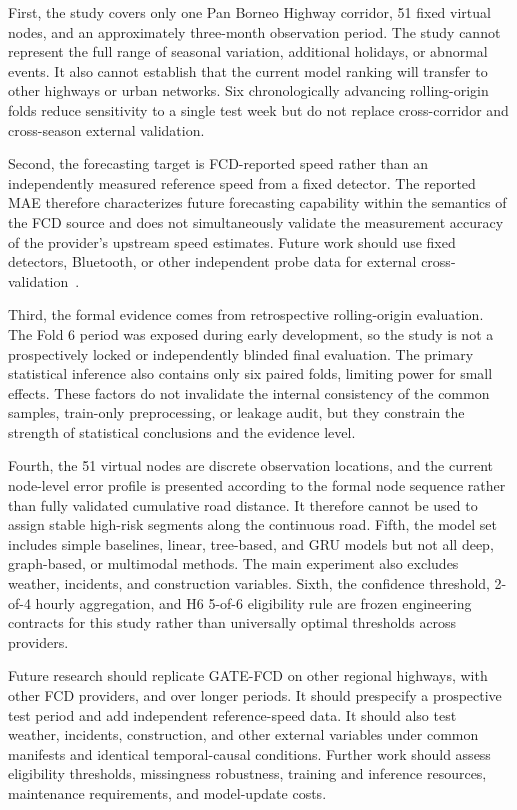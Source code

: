 \documentclass[pdflatex,sn-mathphys-num,iicol]{sn-jnl}
\begin{document}
First, the study covers only one Pan Borneo Highway corridor, 51 fixed virtual nodes, and an approximately three-month observation period. The study cannot represent the full range of seasonal variation, additional holidays, or abnormal events. It also cannot establish that the current model ranking will transfer to other highways or urban networks. Six chronologically advancing rolling-origin folds reduce sensitivity to a single test week but do not replace cross-corridor and cross-season external validation.

Second, the forecasting target is FCD-reported speed rather than an independently measured reference speed from a fixed detector. The reported MAE therefore characterizes future forecasting capability within the semantics of the FCD source and does not simultaneously validate the measurement accuracy of the provider's upstream speed estimates. Future work should use fixed detectors, Bluetooth, or other independent probe data for external cross-validation~\cite{Ipekyuz2025FCD}.

Third, the formal evidence comes from retrospective rolling-origin evaluation. The Fold 6 period was exposed during early development, so the study is not a prospectively locked or independently blinded final evaluation. The primary statistical inference also contains only six paired folds, limiting power for small effects. These factors do not invalidate the internal consistency of the common samples, train-only preprocessing, or leakage audit, but they constrain the strength of statistical conclusions and the evidence level.

Fourth, the 51 virtual nodes are discrete observation locations, and the current node-level error profile is presented according to the formal node sequence rather than fully validated cumulative road distance. It therefore cannot be used to assign stable high-risk segments along the continuous road. Fifth, the model set includes simple baselines, linear, tree-based, and GRU models but not all deep, graph-based, or multimodal methods. The main experiment also excludes weather, incidents, and construction variables. Sixth, the confidence threshold, 2-of-4 hourly aggregation, and H6 5-of-6 eligibility rule are frozen engineering contracts for this study rather than universally optimal thresholds across providers.

Future research should replicate GATE-FCD on other regional highways, with other FCD providers, and over longer periods. It should prespecify a prospective test period and add independent reference-speed data. It should also test weather, incidents, construction, and other external variables under common manifests and identical temporal-causal conditions. Further work should assess eligibility thresholds, missingness robustness, training and inference resources, maintenance requirements, and model-update costs.
\end{document}
